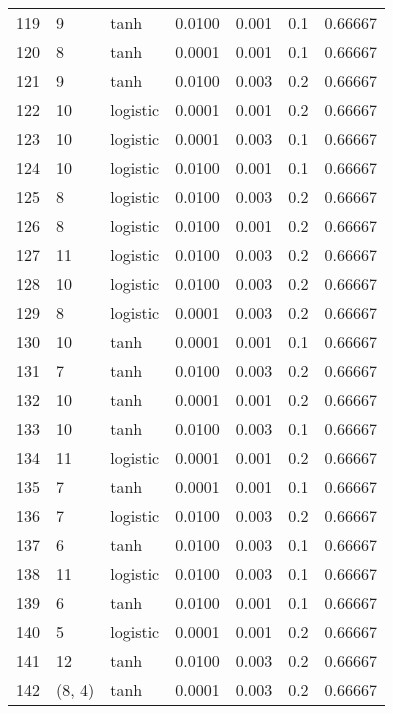 \begin{tabular}{lllrrrr}
119 &           9 &      tanh &  0.0100 &  0.001 &  0.1 &   0.66667 \\
120 &           8 &      tanh &  0.0001 &  0.001 &  0.1 &   0.66667 \\
121 &           9 &      tanh &  0.0100 &  0.003 &  0.2 &   0.66667 \\
122 &          10 &  logistic &  0.0001 &  0.001 &  0.2 &   0.66667 \\
123 &          10 &  logistic &  0.0001 &  0.003 &  0.1 &   0.66667 \\
124 &          10 &  logistic &  0.0100 &  0.001 &  0.1 &   0.66667 \\
125 &           8 &  logistic &  0.0100 &  0.003 &  0.2 &   0.66667 \\
126 &           8 &  logistic &  0.0100 &  0.001 &  0.2 &   0.66667 \\
127 &          11 &  logistic &  0.0100 &  0.003 &  0.2 &   0.66667 \\
128 &          10 &  logistic &  0.0100 &  0.003 &  0.2 &   0.66667 \\
129 &           8 &  logistic &  0.0001 &  0.003 &  0.2 &   0.66667 \\
130 &          10 &      tanh &  0.0001 &  0.001 &  0.1 &   0.66667 \\
131 &           7 &      tanh &  0.0100 &  0.003 &  0.2 &   0.66667 \\
132 &          10 &      tanh &  0.0001 &  0.001 &  0.2 &   0.66667 \\
133 &          10 &      tanh &  0.0100 &  0.003 &  0.1 &   0.66667 \\
134 &          11 &  logistic &  0.0001 &  0.001 &  0.2 &   0.66667 \\
135 &           7 &      tanh &  0.0001 &  0.001 &  0.1 &   0.66667 \\
136 &           7 &  logistic &  0.0100 &  0.003 &  0.2 &   0.66667 \\
137 &           6 &      tanh &  0.0100 &  0.003 &  0.1 &   0.66667 \\
138 &          11 &  logistic &  0.0100 &  0.003 &  0.1 &   0.66667 \\
139 &           6 &      tanh &  0.0100 &  0.001 &  0.1 &   0.66667 \\
140 &           5 &  logistic &  0.0001 &  0.001 &  0.2 &   0.66667 \\
141 &          12 &      tanh &  0.0100 &  0.003 &  0.2 &   0.66667 \\
142 &      (8, 4) &      tanh &  0.0001 &  0.003 &  0.2 &   0.66667 \\

\end{tabular}
